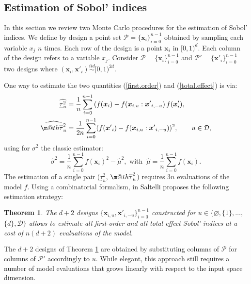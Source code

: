 \documentclass[]{elsarticle}
\makeatletter
\newtheorem{theorem}{Theorem}
\theoremstyle{definition}
\newcommand{\bvec}[1]{\boldsymbol{#1}}
\newcommand{\vx}{\bvec{x}}
\newcommand\iid{\stackrel{iid}{\sim}}
\newcommand*{\ov}[1]{
  \m@th\overline{\mbox{#1}\raisebox{2mm}{}}
}
\makeatother
\begin{document}
\subsection{Estimation of Sobol' indices}
In this section we review two Monte Carlo procedures for the estimation of Sobol' indices. We define by design a point set $\mathcal{P}=\{\vx_i\}_{i=0}^{n-1}$ obtained by sampling each variable $x_j$ $n$ times. Each row of the design is a point $\vx_i$ in $[0,1)^d$. Each column of the design refers to a variable $x_j$. Consider $\mathcal{P}=\{\vx_i\}_{i=0}^{n-1}$ and $\mathcal{P'}=\{{\vx'}_i\}_{i=0}^{n-1}$ two designs where $(\vx_i,{\vx'}_i) \iid [0,1)^{2d}$. 
\bigskip

One way to estimate the two quantities (\ref{first.order}) and (\ref{total.effect}) is via:
\begin{align}
\label{first.order.est}
\widehat{\underline{\tau}_u^2} & = \frac{1}{n} \sum \limits_{i=0}^{n-1} \left(f(\vx_i)-f(\vx_{i,u}:{\vx'}_{i,-u}\right)f(\vx'_i),\\
\label{total.effect.est}
\widehat{\ov{$\tau$}_u^2} & = \frac{1}{2n} \sum \limits_{i=0}^{n-1} (f({\vx'}_i) - f(\vx_{i,u}:{\vx'}_{i,-u}))^2, \qquad u \in \mathcal{D},
\end{align}
using for $\sigma^2$ the classic estimator:
\begin{equation}
 \widehat{\sigma}^2 = \frac{1}{n} \sum \limits_{i=0}^{n-1} f(\vx_i)^2 - \widehat{\mu}^2, \text{ with } \ \widehat{\mu} =  \frac{1}{n} \sum \limits_{i=0}^{n-1} f(\vx_i).
\label{mu.est}
\end{equation}
The estimation of a single pair ($\underline{\tau}_u^2$, $\ov{$\tau$}_u^2$) requires $3n$ evaluations of the model $f$. Using a combinatorial formalism, in \cite[Theorem 1]{Saltelli} Saltelli proposes the following estimation strategy:
\begin{theorem}
\label{saltelli.theorem}
The $d+2$ designs $\{\vx_{i,u},{\vx'}_{i,-u}\}_{i=0}^{n-1}$ constructed for $u \in \{\varnothing,\{1\},\dots,$ $\{d\},\mathcal{D}\}$ allows to estimate all first-order and all total effect Sobol' indices at a cost of $n(d+2)$ evaluations of the model.
\end{theorem}
The $d+2$ designs of Theorem \ref{saltelli.theorem} are obtained by substituting columns of $\mathcal{P}$ for columns of $\mathcal{P}'$ accordingly to $u$. While elegant, this approach still requires a number of model evaluations that grows linearly with respect to the input space dimension.
\end{document}
